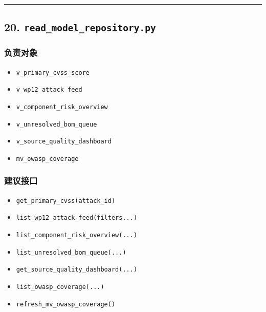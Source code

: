 \documentclass[UTF8]{ctexart}
\providecommand{\tightlist}{%
  \setlength{\itemsep}{0pt}\setlength{\parskip}{0pt}}
\begin{document}
\begin{center}\rule{0.5\linewidth}{0.5pt}\end{center}

\hypertarget{read_model_repository.py}{%
\subsection{\texorpdfstring{20.
\texttt{read\_model\_repository.py}}{20. read\_model\_repository.py}}\label{read_model_repository.py}}

\hypertarget{ux8d1fux8d23ux5bf9ux8c61-4}{%
\subsubsection{负责对象}\label{ux8d1fux8d23ux5bf9ux8c61-4}}

\begin{itemize}
\tightlist
\item
  \texttt{v\_primary\_cvss\_score}
\item
  \texttt{v\_wp12\_attack\_feed}
\item
  \texttt{v\_component\_risk\_overview}
\item
  \texttt{v\_unresolved\_bom\_queue}
\item
  \texttt{v\_source\_quality\_dashboard}
\item
  \texttt{mv\_owasp\_coverage}
\end{itemize}

\hypertarget{ux5efaux8baeux63a5ux53e3-4}{%
\subsubsection{建议接口}\label{ux5efaux8baeux63a5ux53e3-4}}

\begin{itemize}
\tightlist
\item
  \texttt{get\_primary\_cvss(attack\_id)}
\item
  \texttt{list\_wp12\_attack\_feed(filters...)}
\item
  \texttt{list\_component\_risk\_overview(...)}
\item
  \texttt{list\_unresolved\_bom\_queue(...)}
\item
  \texttt{get\_source\_quality\_dashboard(...)}
\item
  \texttt{list\_owasp\_coverage(...)}
\item
  \texttt{refresh\_mv\_owasp\_coverage()}
\end{itemize}
\end{document}
